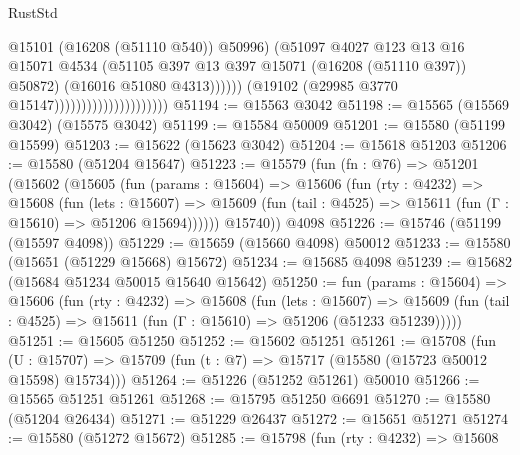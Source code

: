 \begin{lexlean}{RustStd}
\begin{coremodule}
                                                    @15101
                                                    (@16208 (@51110 @540))
                                                    @50996)
                                                  (@51097
                                                    @4027
                                                    @123
                                                    @13
                                                    @16
                                                    @15071
                                                    @4534
                                                    (@51105
                                                      @397
                                                      @13
                                                      @397
                                                      @15071
                                                      (@16208 (@51110 @397))
                                                      @50872)
                                                    (@16016 @51080 @4313))))))
                                          (@19102 (@29985 @3770 @15147)))))))))))))))))))))
@51194 := @15563 @3042
@51198 := @15565 (@15569 @3042) (@15575 @3042)
@51199 := @15584 @50009
@51201 := @15580 (@51199 @15599)
@51203 := @15622 (@15623 @3042)
@51204 := @15618 @51203
@51206 := @15580 (@51204 @15647)
@51223 := @15579
    (fun (fn : @76) =>
    @51201
      (@15602
        (@15605
          (fun (params : @15604) =>
          @15606
            (fun (rty : @4232) =>
            @15608
              (fun (lets : @15607) =>
              @15609 (fun (tail : @4525) => @15611 (fun (Γ : @15610) => @51206 @15694))))))
        @15740))
    @4098
@51226 := @15746 (@51199 (@15597 @4098))
@51229 := @15659 (@15660 @4098) @50012
@51233 := @15580 (@15651 (@51229 @15668) @15672)
@51234 := @15685 @4098
@51239 := @15682 (@15684 @51234 @50015 @15640 @15642)
@51250 := fun (params : @15604) =>
  @15606
    (fun (rty : @4232) =>
    @15608
      (fun (lets : @15607) =>
      @15609 (fun (tail : @4525) => @15611 (fun (Γ : @15610) => @51206 (@51233 @51239)))))
@51251 := @15605 @51250
@51252 := @15602 @51251
@51261 := @15708
    (fun (U : @15707) => @15709 (fun (t : @7) => @15717 (@15580 (@15723 @50012 @15598) @15734)))
@51264 := @51226 (@51252 @51261) @50010
@51266 := @15565 @51251 @51261
@51268 := @15795 @51250 @6691
@51270 := @15580 (@51204 @26434)
@51271 := @51229 @26437
@51272 := @15651 @51271
@51274 := @15580 (@51272 @15672)
@51285 := @15798
    (fun (rty : @4232) =>
    @15608

\end{coremodule}
\end{lexlean}
